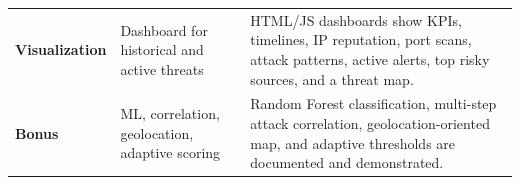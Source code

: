 \begin{table}[H]
\begin{tabularx}{\textwidth}{>{\bfseries}p{} X X}
        Visualization & Dashboard for historical and active threats & HTML/JS dashboards show KPIs, timelines, IP reputation, port scans, attack patterns, active alerts, top risky sources, and a threat map. \\
        Bonus & ML, correlation, geolocation, adaptive scoring & Random Forest classification, multi-step attack correlation, geolocation-oriented map, and adaptive thresholds are documented and demonstrated. \\
        \bottomrule
    \end{tabularx}
\end{table}
